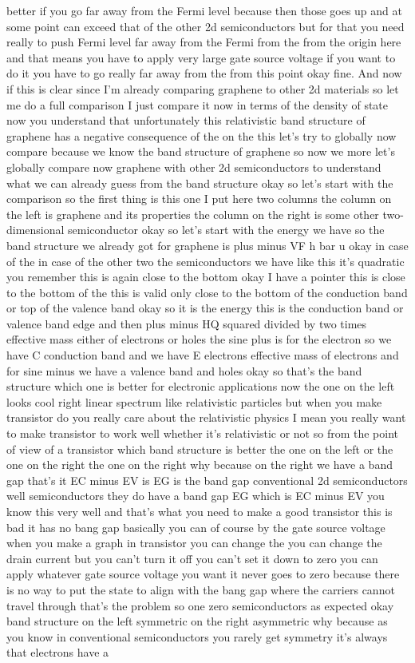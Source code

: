 better if you go far away from the Fermi level because then those goes up and at some point can exceed that of the other 2d semiconductors but for that you need really to push Fermi level far away from the Fermi from the from the origin here and that means you have to apply very large gate source voltage if you want to do it you have to go really far away from the from this point okay fine.
And now if this is clear since I'm already comparing graphene to other 2d materials so let me do a full comparison I just compare it now in terms of the density of state now you understand that unfortunately this relativistic band structure of graphene has a negative consequence of the on the this let's try to globally now compare because we know the band structure of graphene so now we more let's globally compare now graphene with other 2d semiconductors to understand what we can already guess from the band structure okay so let's start with the comparison so the first thing is this one I put here two columns the column on the left is graphene and its properties the column on the right is some other two-dimensional semiconductor okay so let's start with the energy we have so the band structure we already got for graphene is plus minus VF h bar u okay in case of the in case of the other two the semiconductors we have like this it's quadratic you remember this is again close to the bottom okay I have a pointer this is close to the bottom of the this is valid only close to the bottom of the conduction band or top of the valence band okay so it is the energy this is the conduction band or valence band edge and then plus minus HQ squared divided by two times effective mass either of electrons or holes the sine plus is for the electron so we have C conduction band and we have E electrons effective mass of electrons and for sine minus we have a valence band and holes okay so that's the band structure which one is better for electronic applications now the one on the left looks cool right linear spectrum like relativistic particles but when you make transistor do you really care about the relativistic physics I mean you really want to make transistor to work well whether it's relativistic or not so from the point of view of a transistor which band structure is better the one on the left or the one on the right the one on the right why because on the right we have a band gap that's it EC minus EV is EG is the band gap conventional 2d semiconductors well semiconductors they do have a band gap EG which is EC minus EV you know this very well and that's what you need to make a good transistor this is bad it has no bang gap basically you can of course by the gate source voltage when you make a graph in transistor you can change the you can change the drain current but you can't turn it off you can't set it down to zero you can apply whatever gate source voltage you want it never goes to zero because there is no way to put the state to align with the bang gap where the carriers cannot travel through that's the problem so one zero semiconductors as expected okay band structure on the left symmetric on the right asymmetric why because as you know in conventional semiconductors you rarely get symmetry it's always that electrons have a 